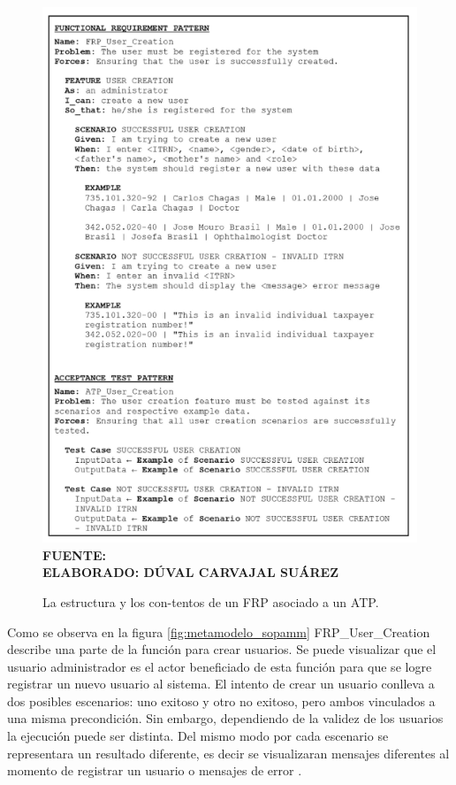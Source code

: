 \begin{figure}[h!]
	\caption{La estructura y los con-tentos de un FRP asociado a un ATP.}
	\includegraphics[width=15cm]{img/metamodelo.png}
	\label{fig:metamodelo}
	\textbf{\\ FUENTE: \cite{Mohamed} \\ ELABORADO: DÚVAL CARVAJAL SUÁREZ}
\end{figure}

Como se observa en la figura \ref{fig:metamodelo_sopamm} FRP\_User\_Creation describe una parte de la función para crear usuarios. Se puede visualizar que el usuario administrador es el actor beneficiado de esta función para que se logre registrar un nuevo usuario al sistema. El intento de crear un usuario conlleva a dos posibles escenarios: uno exitoso y otro no exitoso, pero ambos vinculados a una misma precondición.  Sin embargo, dependiendo de la validez de los usuarios la ejecución puede ser distinta. Del mismo modo por cada escenario se representara un resultado diferente, es decir se visualizaran mensajes diferentes al momento de registrar un usuario o mensajes de error \cite{Mohamed}.

